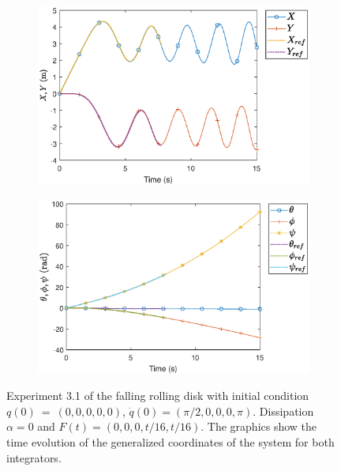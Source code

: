 \documentclass{aims}
\numberwithin{equation}{section}
\theoremstyle{definition}
\begin{document}
\begin{figure}
  \centering
  \begin{subfigure}[b]{0.75\textwidth}
    \centering
    \includegraphics[width=\textwidth]{fig/31XY.eps}
  \end{subfigure}
  \par\bigskip
  \begin{subfigure}[b]{0.75\textwidth}
    \centering
    \includegraphics[width=\textwidth]{fig/31thetaphipsi.eps}
  \end{subfigure}
  \caption{Experiment 3.1 of the falling rolling disk with initial condition $q(0)~=~(0,0,0,0,0)$, $\dot{q}(0) = (\pi/2,0,0,0,\pi)$. Dissipation $\alpha = 0$ and $F(t) = (0,0,0,t/16,t/16)$. The graphics show the time evolution of the generalized coordinates of the system for both integrators.}
  \label{fig:disco_experimento_3_1_1}
\end{figure}
\end{document}
